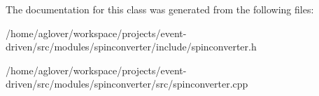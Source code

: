 The documentation for this class was generated from the following files\+:\begin{DoxyCompactItemize}
\item 
/home/aglover/workspace/projects/event-\/driven/src/modules/spinconverter/include/spinconverter.\+h\item 
/home/aglover/workspace/projects/event-\/driven/src/modules/spinconverter/src/spinconverter.\+cpp\end{DoxyCompactItemize}
